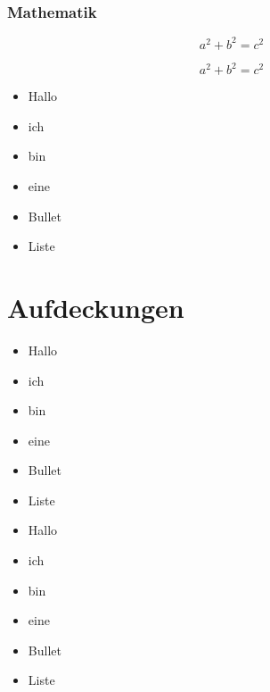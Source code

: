 \documentclass[ngerman]{beamer}
\begin{document}
\begin{frame}
\frametitle{Mathematik}

\[a^2 + b^2 = c^2 \]

\begin{equation}
a^2 + b^2 = c^2
\end{equation}


\end{frame}

\begin{frame}

\begin{itemize}
	\item Hallo \pause
	\item ich \pause
	\item bin  \pause
	\item eine \pause 
	\item Bullet
	\item Liste
\end{itemize}

\end{frame}

\section{Aufdeckungen}

\begin{frame}

\begin{itemize}
	\item<1-> Hallo 
	\item<2> ich 
	\item<-2> bin  
	\item<3-> eine 
	\item<1> Bullet
	\item<2> Liste
\end{itemize}

\end{frame}


\begin{frame}

\begin{itemize}
	\item<1-> Hallo 
	\item<2-> ich 
	\item<3-> bin  
	\item<4-> eine 
	\item<5-> Bullet
	\item<6-> Liste
\end{itemize}

\end{frame}
\end{document}
